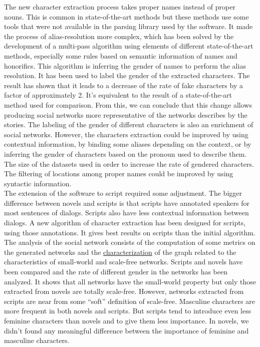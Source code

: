 \documentclass[a4paper, 12pt]{report}
\begin{document}
The new character extraction process takes proper names instead of proper nouns. This is common in state-of-the-art methods but these methods use some tools that were not available in the parsing library used by the software. It made the process of alias-resolution more complex, which has been solved by the development of a multi-pass algorithm using elements of different state-of-the-art methods, especially some rules based on semantic information of names and honorifics. This algorithm is inferring the gender of names to perform the alias resolution. It has been used to label the gender of the extracted characters.
The result has shown that it leads to a decrease of the rate of fake characters by a factor of approximately 2.
It's equivalent to the result of a state-of-the-art method used for comparison.
From this, we can conclude that this change allows producing social networks more representative of the networks describes by the stories.
The labeling of the gender of different characters is also an enrichment of social networks.
However, the characters extraction could be improved by using contextual information,
by binding some aliases depending on the context, or by inferring the gender of characters based on the pronoun used to describe them.
The size of the datasets used in order to increase the rate of gendered characters. The filtering of locations among proper names could be improved by using syntactic information.\\

The extension of the software to script required some adjustment. The bigger difference between novels and scripts is that scripts have annotated speakers for most sentences of dialogs. Scripts also have less contextual information between dialogs.
A new algorithm of character extraction has been designed for scripts, using those annotations. It gives best results on scripts than the initial algorithm. \\

The analysis of the social network consists of the computation of some metrics on the generated networks and the \hyperref[char]{characterization} of the graph related to the characteristics of small-world and scale-free networks. Scripts and novels have been compared and the rate of different gender in the networks has been analyzed. It shows that all networks have the small-world property but only those extracted from novels are totally scale-free. However, networks extracted from scripts are near from some ``soft'' definition of scale-free. Masculine characters are more frequent in both novels and scripts. But scripts tend to introduce even less feminine characters than novels and to give them less importance. In novels, we didn't found any meaningful difference between the importance of feminine and masculine characters.
\end{document}
